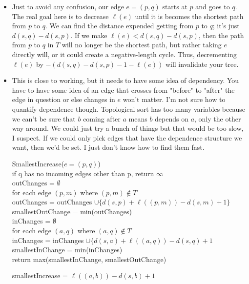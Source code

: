 \documentclass[11pt]{article}
\begin{document}
\begin{solution}
    \begin{itemize}
        \item Just to avoid any confusion, our edge $e = (p, q)$ starts at $p$ and goes to $q$. The real goal here is to decrease $\ell(e)$ until it is becomes the shortest path from $p$ to $q$. We can find the distance expended getting from $p$ to $q$; it's just $d(s, q) - d(s, p)$. If we make $\ell(e) < d(s, q) - d(s, p)$, then the path from $p$ to $q$ in $T$ will no longer be the shortest path, but rather taking $e$ directly will, or it could create a negative-length cycle. Thus, decrementing $\ell(e)$ by $-(d(s, q) - d(s, p) - 1 - \ell(e))$ will invalidate your tree.
        \item This is close to working, but it needs to have some idea of dependency. You have to have some idea of an edge that crosses from "before" to "after" the edge in question or else changes in $e$ won't matter. I'm not sure how to quantify dependence though. Topological sort has too many variables because we can't be sure that $b$ coming after $a$ means $b$ depends on $a$, only the other way around. We could just try a bunch of things but that would be too slow, I suspect. If we could only pick edges that have the dependence structure we want, then we'd be set. I just don't know how to find them fast.
            \begin{algo}
                SmallestIncrease($e = (p, q)$) \+
                \\ if q has no incoming edges other than p, return $\infty$
                \\ outChanges = $\emptyset$
                \\ for each edge $(p, m)$ where $(p, m) \not \in T$ \+
                \\ outChanges = outChanges $\cup \{d(s, p) + \ell((p, m)) - d(s, m) + 1\}$ \-
                \\ smallestOutChange = min(outChanges)
                \\ inChanges = $\emptyset$
                \\ for each edge $(a, q)$ where $(a, q) \not \in T$ \+
                \\ inChanges = inChanges $\cup \{d(s, a) + \ell((a, q)) - d(s, q) + 1$ \-
                \\ smallestInChange = min(inChanges)
                \\ return max(smallestInChange, smallestOutChange)
            \end{algo}
            \begin{algo}
                smallestIncrease = $\ell((a, b)) - d(s, b) + 1$
            \end{algo}
    \end{itemize}
\end{solution}
\end{document}
